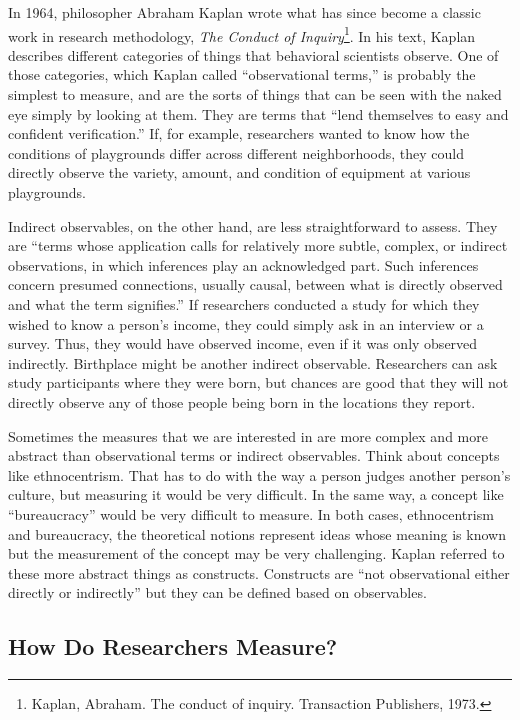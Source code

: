 In 1964, philosopher Abraham Kaplan wrote what has since become a classic work in research methodology, \textit{The Conduct of Inquiry}\footnote{Kaplan, Abraham. The conduct of inquiry. Transaction Publishers, 1973.}. In his text, Kaplan describes different categories of things that behavioral scientists observe. One of those categories, which Kaplan called ``observational terms,'' is probably the simplest to measure, and are the sorts of things that can be seen with the naked eye simply by looking at them. They are terms that ``lend themselves to easy and confident verification.'' If, for example, researchers wanted to know how the conditions of playgrounds differ across different neighborhoods, they could directly observe the variety, amount, and condition of equipment at various playgrounds.

Indirect observables, on the other hand, are less straightforward to assess. They are ``terms whose application calls for relatively more subtle, complex, or indirect observations, in which inferences play an acknowledged part. Such inferences concern presumed connections, usually causal, between what is directly observed and what the term signifies.'' If researchers conducted a study for which they wished to know a person's income, they could simply ask in an interview or a survey. Thus, they would have observed income, even if it was only observed indirectly. Birthplace might be another indirect observable. Researchers can ask study participants where they were born, but chances are good that they will not directly observe any of those people being born in the locations they report.

Sometimes the measures that we are interested in are more complex and more abstract than observational terms or indirect observables. Think about concepts like ethnocentrism. That has to do with the way a person judges another person's culture, but measuring it would be very difficult. In the same way, a concept like  ``bureaucracy'' would be very difficult to measure. In both cases, ethnocentrism and bureaucracy, the theoretical notions represent ideas whose meaning is known but the measurement of the concept may be very challenging. Kaplan referred to these more abstract things as constructs. Constructs are ``not observational either directly or indirectly'' but they can be defined based on observables.

\subsection{How Do Researchers Measure?}

